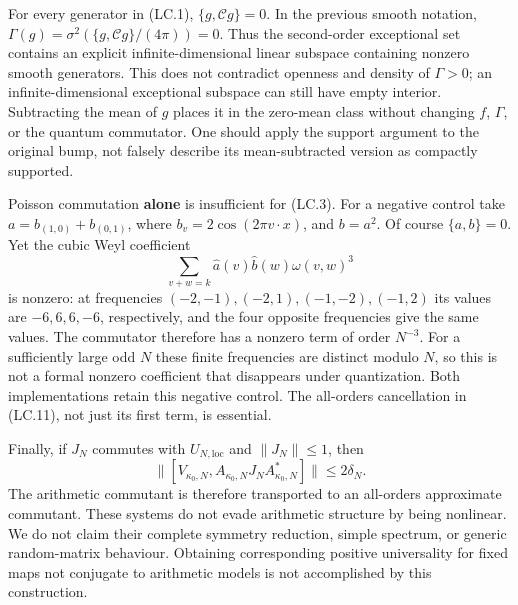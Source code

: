 For every generator in (LC.1), \(\{g,\mathcal Cg\}=0\). In the previous smooth notation, \(\Gamma(g)=\sigma^2(\{g,\mathcal Cg\}/(4\pi))=0\). Thus the second-order exceptional set contains an explicit infinite-dimensional linear subspace containing nonzero smooth generators. This does not contradict openness and density of \(\Gamma>0\); an infinite-dimensional exceptional subspace can still have empty interior. Subtracting the mean of \(g\) places it in the zero-mean class without changing \(f\), \(\Gamma\), or the quantum commutator. One should apply the support argument to the original bump, not falsely describe its mean-subtracted version as compactly supported.

Poisson commutation \textbf{alone} is insufficient for (LC.3). For a negative control take \(a=b_{(1,0)}+b_{(0,1)}\), where \(b_v=2\cos(2\pi v\cdot x)\), and \(b=a^2\). Of course \(\{a,b\}=0\). Yet the cubic Weyl coefficient \[
 \sum_{v+w=k}\widehat a(v)\widehat b(w)\omega(v,w)^3
\] is nonzero: at frequencies \((-2,-1),(-2,1),(-1,-2),(-1,2)\) its values are \(-6,6,6,-6\), respectively, and the four opposite frequencies give the same values. The commutator therefore has a nonzero term of order \(N^{-3}\). For a sufficiently large odd \(N\) these finite frequencies are distinct modulo \(N\), so this is not a formal nonzero coefficient that disappears under quantization. Both implementations retain this negative control. The all-orders cancellation in (LC.11), not just its first term, is essential.

Finally, if \(J_N\) commutes with \(U_{N,\mathrm{loc}}\) and \(\|J_N\|\leq1\), then \[
 \|[V_{{\kappa_0},N},A_{{\kappa_0},N}J_NA_{{\kappa_0},N}^*]\|
        \leq2\delta_N.                                    \tag{LC.27}
\] The arithmetic commutant is therefore transported to an all-orders approximate commutant. These systems do not evade arithmetic structure by being nonlinear. We do not claim their complete symmetry reduction, simple spectrum, or generic random-matrix behaviour. Obtaining corresponding positive universality for fixed maps not conjugate to arithmetic models is not accomplished by this construction.
